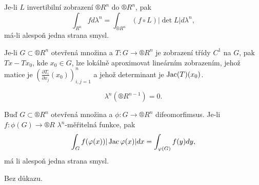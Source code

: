\documentclass[12pt]{article}					%
\begin{document}
\begin{veta}
	Je-li $L$ invertibilní zobrazení $®R^n$ do $®R^n$, pak
	$$ \int_{R^n} f d\lambda^n = \int_{®R^n} (f \circ L) |\det L| d\lambda^n, $$
	má-li alespoň jedna strana smysl.
\end{veta}

\begin{tvrzeni}[Opakování]
	Je-li $G \subset ®R^n$ otevřená množina a $T: G \rightarrow ®R^n$ je zobrazení třídy $C^1$ na $G$, pak $Tx - Tx_0$, kde  $x_0 \in G$, lze lokálně aproximovat lineárním zobrazením, jehož matice je $(\frac{\partial T_i}{\partial x_j} (x_0))_{i, j = 1}^n$ a jehož determinant je $\operatorname{Jac}(T)(x_0)$.
\end{tvrzeni}

\begin{lemma}
	$$ \lambda^n(®R^{n-1}) = 0. $$
\end{lemma}

\veta[O substituci]
	Buď $G \subset ®R^n$ otevřená množina a $\phi: G \rightarrow ®R^n$ difeomorfimsus. Je-li $f: \phi(G) \rightarrow ®R$ $\lambda^n$-měřitelná funkce, pak
	$$ \int_G f(\varphi(x)) |\operatorname{Jac} \varphi(x)| dx = \int_{\varphi(G)} f(y) dy, $$
	má li alespoň jedna strana smysl.

	\begin{dukazin}
		Bez důkazu.
	\end{dukazin}
\end{document}
